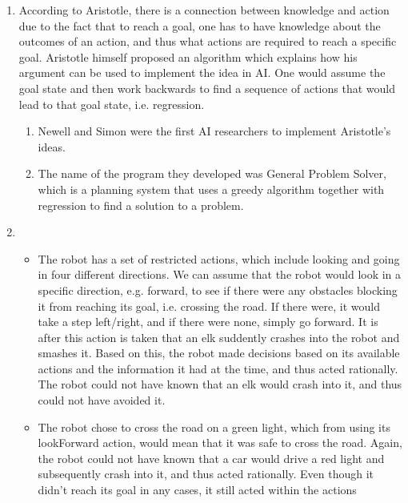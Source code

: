 \begin{enumerate}
    \autocite[pp.~19--22]{russell2021artificial}.
  \item
    According to Aristotle, there is a connection between knowledge and action
    due to the fact that to reach a goal, one has to have knowledge about the 
    outcomes of an action, and thus what actions are required to reach a 
    specific goal. Aristotle himself proposed an algorithm which explains how
    his argument can be used to implement the idea in AI. One would assume the 
    goal state and then work backwards to find a sequence of actions that would
    lead to that goal state, i.e. regression.
    \begin{enumerate}
        \item 
            Newell and Simon were the first AI researchers to implement 
            Aristotle's ideas.
        \item 
            The name of the program they developed was General Problem Solver, 
            which is a planning system that uses a greedy algorithm together
            with regression to find a solution to a problem.
    \end{enumerate} 
    \autocite[p.~25]{russell2021artificial}
  \item 
    \begin{itemize}
    \item
        The robot has a set of restricted actions, which include looking and 
        going in four different directions. We can assume that the robot would 
        look in a specific direction, e.g. forward, to see if there were any 
        obstacles blocking it from reaching its goal, i.e. crossing the road. 
        If there were, it would take a step left/right, and if there were none, 
        simply go forward. It is after this action is taken that an elk 
        suddently crashes into the robot and smashes it. Based on this, the 
        robot made decisions based on its available actions and the information 
        it had at the time, and thus acted rationally. The robot could not have 
        known that an elk would crash into it, and thus could not have avoided 
        it. 
    \item
        The robot chose to cross the road on a green light, which from using its 
        lookForward action, would mean that it was safe to cross the road. 
        Again, the robot could not have known that a car would drive a red light 
        and subsequently crash into it, and thus acted rationally. Even though 
        it didn't reach its goal in any cases, it still acted within the actions 

\end{itemize}
\end{enumerate}
